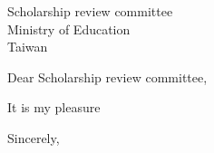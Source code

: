 \documentclass[12pt, a4paper]{simref} %
\begin{document}

\begin{letter}{
	Scholarship review committee\\
	Ministry of Education\\
	Taiwan\\
}

\vspace{3cm}
\opening{Dear Scholarship review committee,}

It is my pleasure


\closing{Sincerely,}




\end{letter}
\end{document}
